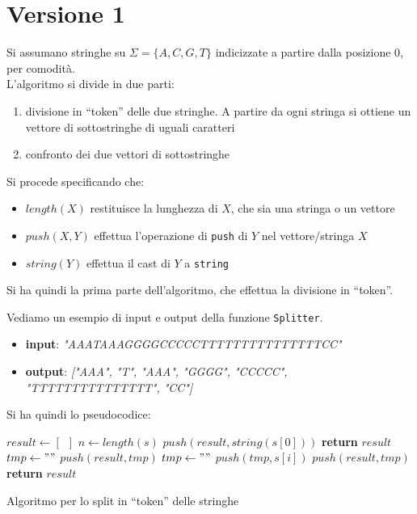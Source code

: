 \documentclass[a4paper,12pt, oneside]{book}
\begin{document}
\section{Versione 1}
Si assumano stringhe su $\Sigma=\{A,C,G,T\}$ indicizzate a partire dalla
posizione 0, per comodità.\\
L'algoritmo si divide in due parti:
\begin{enumerate}
  \item divisione in ``token'' delle due stringhe. A partire da ogni stringa si
  ottiene un vettore di sottostringhe di uguali caratteri
  \item confronto dei due vettori di sottostringhe
\end{enumerate}
Si procede specificando che:
\begin{itemize}
  \item $length(X)$ restituisce la lunghezza di $X$, che sia una stringa o un
  vettore 
  \item $push(X,Y)$ effettua l'operazione di \texttt{push} di $Y$ nel
  vettore/stringa $X$
  \item $string(Y)$ effettua il cast di $Y$ a \texttt{string}
\end{itemize}
Si ha quindi la prima parte dell'algoritmo, che effettua la divisione in
``token''.
\newpage
\begin{esempio}
  Vediamo un esempio di input e output della funzione \texttt{Splitter}.
  \begin{itemize}
    \item \textbf{input}: \textit{"AAATAAAGGGGCCCCCTTTTTTTTTTTTTTTCC"}
    \item \textbf{output}: \textit{["AAA", "T", "AAA", "GGGG", "CCCCC",\\
      "TTTTTTTTTTTTTTT", "CC"]} 
  \end{itemize}
\end{esempio}
Si ha quindi lo pseudocodice:
\begin{algorithm}[H]
  \begin{algorithmic}[1]
    \State $result \gets \left[\,\,\,\right]$
    \State $n\gets length(s)$
    \State $push(result, string(s[0]))$
    \State \textbf{return} $result$
    \EndIf
    \State $tmp \gets ""$
    \State $push(result, tmp)$
    \State $tmp \gets ""$
    \EndIf
    \State $push(tmp, s[i])$
    \State $push(result, tmp)$
    \EndIf
    \EndFor
    \State \textbf{return} $result$
    \EndFunction
  \end{algorithmic}
  \caption{Algoritmo per lo split in ``token'' delle stringhe}
\end{algorithm}
\end{document}
